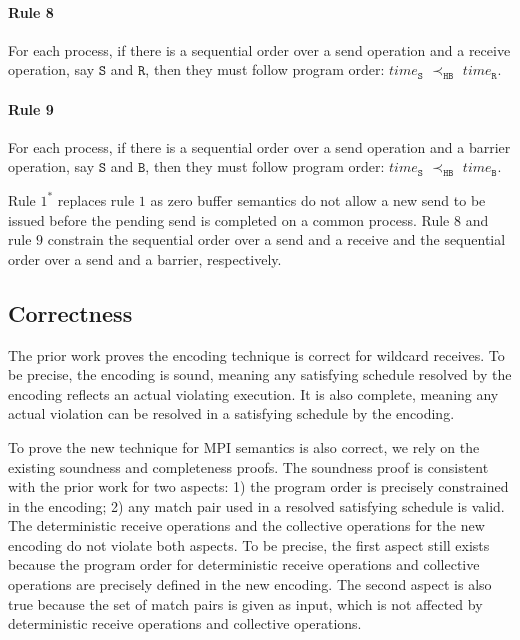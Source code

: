 \paragraph*{Rule 8} For each process, if there is a sequential order over a send operation and a receive operation, say $\mathtt{S}$ and $\mathtt{R}$, then they must follow program order: 
$\mathit{time}_\mathtt{S}$
$\prec_\mathtt{HB}$ $\mathit{time}_\mathtt{R}$.

\paragraph*{Rule 9} For each process, if there is a sequential order over a send operation and a barrier operation, say $\mathtt{S}$ and $\mathtt{B}$, then they must follow program order: 
$\mathit{time}_\mathtt{S}$
$\prec_\mathtt{HB}$ $\mathit{time}_\mathtt{B}$.

Rule $1^*$ replaces rule $1$ as zero buffer semantics do not allow a new send to be issued before the pending send is completed on a common process. Rule $8$ and rule $9$ constrain the sequential order over a send and a receive and the sequential order over a send and a barrier, respectively.

\subsection{Correctness}
The prior work \cite{DBLP:conf/kbse/HuangMM13} proves the encoding technique is correct for wildcard receives. To be precise, the encoding is sound, meaning any satisfying schedule resolved by the encoding reflects an actual violating execution. It is also complete, meaning any actual violation can be resolved in a satisfying schedule by the encoding. 

To prove the new technique for MPI semantics is also correct, we rely on the existing soundness and completeness proofs. The soundness proof is consistent with the prior work for two aspects: 1) the program order is precisely constrained in the encoding; 2) any match pair used in a resolved satisfying schedule is valid. The deterministic receive operations and the collective operations for the new encoding do not violate both aspects. To be precise, the first aspect still exists because the program order for deterministic receive operations and collective operations are precisely defined in the new encoding. The second aspect is also true because the set of match pairs is given as input, which is not affected by deterministic receive operations and collective operations. 

